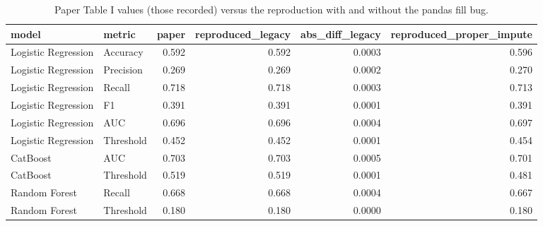 \begin{table}[t]
\centering
\caption{Paper Table I values (those recorded) versus the reproduction with and without the pandas fill bug.}
\label{tab:T2a_table1_reproduction}
\small
\begin{tabular}{llrrrr}
\toprule
model & metric & paper & reproduced\_legacy & abs\_diff\_legacy & reproduced\_proper\_impute \\
\midrule
Logistic Regression & Accuracy & 0.592 & 0.592 & 0.0003 & 0.596 \\
Logistic Regression & Precision & 0.269 & 0.269 & 0.0002 & 0.270 \\
Logistic Regression & Recall & 0.718 & 0.718 & 0.0003 & 0.713 \\
Logistic Regression & F1 & 0.391 & 0.391 & 0.0001 & 0.391 \\
Logistic Regression & AUC & 0.696 & 0.696 & 0.0004 & 0.697 \\
Logistic Regression & Threshold & 0.452 & 0.452 & 0.0001 & 0.454 \\
CatBoost & AUC & 0.703 & 0.703 & 0.0005 & 0.701 \\
CatBoost & Threshold & 0.519 & 0.519 & 0.0001 & 0.481 \\
Random Forest & Recall & 0.668 & 0.668 & 0.0004 & 0.667 \\
Random Forest & Threshold & 0.180 & 0.180 & 0.0000 & 0.180 \\
\bottomrule
\end{tabular}
\end{table}
